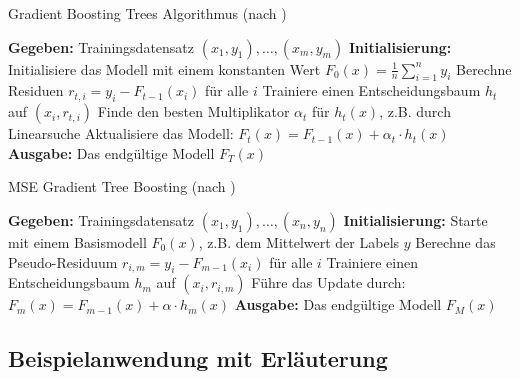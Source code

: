 \begin{algorithm}[H]
    \caption[Gradient Boosting Trees Algorithmus]{Gradient Boosting Trees Algorithmus (nach \textcite[S.~346]{Frochte2020})}\label{algo:gbt}
    \begin{algorithmic}[1]
    \State \textbf{Gegeben:} Trainingsdatensatz \( (x_1,y_1), \dots, (x_m,y_m) \)
    \State \textbf{Initialisierung:} Initialisiere das Modell mit einem konstanten Wert \( F_0(x) = \frac{1}{n} \sum_{i=1}^{n} y_i \)
        \State Berechne Residuen \( r_{t,i} = y_i - F_{t-1}(x_i) \) für alle \( i \)
        \State Trainiere einen Entscheidungsbaum \( h_t \) auf \( (x_i, r_{t,i}) \)
        \State Finde den besten Multiplikator \( \alpha_t \) für \( h_t(x) \), z.B. durch Linearsuche
        \State Aktualisiere das Modell: \( F_t(x) = F_{t-1}(x) + \alpha_t \cdot h_t(x) \)
    \EndFor
    \State \textbf{Ausgabe:} Das endgültige Modell \( F_T(x) \)
    \end{algorithmic}
\end{algorithm}

\begin{algorithm}[H]
    \caption[MSE Gradient Tree Boosting]{MSE Gradient Tree Boosting (nach \textcite[S.~346]{Frochte2020})}\label{algo:gbt}
    \begin{algorithmic}[1]
    \State \textbf{Gegeben:} Trainingsdatensatz \( (x_1,y_1), \dots, (x_n,y_n) \)
    \State \textbf{Initialisierung:} Starte mit einem Basismodell \( F_0(x) \), z.B. dem Mittelwert der Labels \( y \)
        \State Berechne das Pseudo-Residuum \( r_{i,m} = y_i - F_{m-1}(x_i) \) für alle \( i \)
        \State Trainiere einen Entscheidungsbaum \( h_m \) auf \( (x_i, r_{i,m}) \)
        \State Führe das Update durch: \( F_m(x) = F_{m-1}(x) + \alpha \cdot h_m(x) \)
    \EndFor
    \State \textbf{Ausgabe:} Das endgültige Modell \( F_M(x) \)
    \end{algorithmic}
\end{algorithm}





\subsection{Beispielanwendung mit Erläuterung}
